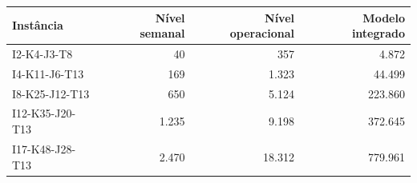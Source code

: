 \begin{tabular}{@{}lrrr@{}}
\toprule
Instância & Nível semanal & Nível operacional & Modelo integrado \\
\midrule
I2-K4-J3-T8 & 40 & 357 & 4.872 \\
I4-K11-J6-T13 & 169 & 1.323 & 44.499 \\
I8-K25-J12-T13 & 650 & 5.124 & 223.860 \\
I12-K35-J20-T13 & 1.235 & 9.198 & 372.645 \\
I17-K48-J28-T13 & 2.470 & 18.312 & 779.961 \\
\bottomrule
\end{tabular}
